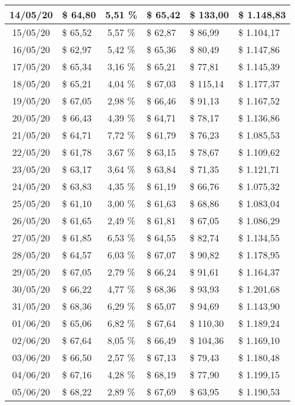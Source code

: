 \begin{center}
\begin{small}
\begin{longtable}{|c|l|c|l|l|l|}
14/05/20 & \$ 64,80 & 5,51 \% & \$ 65,42 & \$ 133,00 & \$ 1.148,83 \\ \hline
15/05/20 & \$ 65,52 & 5,57 \% & \$ 62,87 & \$ 86,99 & \$ 1.104,17 \\ \hline
16/05/20 & \$ 62,97 & 5,42 \% & \$ 65,36 & \$ 80,49 & \$ 1.147,86 \\ \hline
17/05/20 & \$ 65,34 & 3,16 \% & \$ 65,21 & \$ 77,81 & \$ 1.145,39 \\ \hline
18/05/20 & \$ 65,21 & 4,04 \% & \$ 67,03 & \$ 115,14 & \$ 1.177,37 \\ \hline
19/05/20 & \$ 67,05 & 2,98 \% & \$ 66,46 & \$ 91,13 & \$ 1.167,52 \\ \hline
20/05/20 & \$ 66,43 & 4,39 \% & \$ 64,71 & \$ 78,17 & \$ 1.136,86 \\ \hline
21/05/20 & \$ 64,71 & 7,72 \% & \$ 61,79 & \$ 76,23 & \$ 1.085,53 \\ \hline
22/05/20 & \$ 61,78 & 3,67 \% & \$ 63,15 & \$ 78,67 & \$ 1.109,62 \\ \hline
23/05/20 & \$ 63,17 & 3,64 \% & \$ 63,84 & \$ 71,35 & \$ 1.121,71 \\ \hline
24/05/20 & \$ 63,83 & 4,35 \% & \$ 61,19 & \$ 66,76 & \$ 1.075,32 \\ \hline
25/05/20 & \$ 61,10 & 3,00 \% & \$ 61,63 & \$ 68,86 & \$ 1.083,04 \\ \hline
26/05/20 & \$ 61,65 & 2,49 \% & \$ 61,81 & \$ 67,05 & \$ 1.086,29 \\ \hline
27/05/20 & \$ 61,85 & 6,53 \% & \$ 64,55 & \$ 82,74 & \$ 1.134,55 \\ \hline
28/05/20 & \$ 64,57 & 6,03 \% & \$ 67,07 & \$ 90,82 & \$ 1.178,95 \\ \hline
29/05/20 & \$ 67,05 & 2,79 \% & \$ 66,24 & \$ 91,61 & \$ 1.164,37 \\ \hline
30/05/20 & \$ 66,22 & 4,77 \% & \$ 68,36 & \$ 93,93 & \$ 1.201,68 \\ \hline
31/05/20 & \$ 68,36 & 6,29 \% & \$ 65,07 & \$ 94,69 & \$ 1.143,90 \\ \hline
01/06/20 & \$ 65,06 & 6,82 \% & \$ 67,64 & \$ 110,30 & \$ 1.189,24 \\ \hline
02/06/20 & \$ 67,64 & 8,05 \% & \$ 66,49 & \$ 104,36 & \$ 1.169,10 \\ \hline
03/06/20 & \$ 66,50 & 2,57 \% & \$ 67,13 & \$ 79,43 & \$ 1.180,48 \\ \hline
04/06/20 & \$ 67,16 & 4,28 \% & \$ 68,19 & \$ 77,90 & \$ 1.199,15 \\ \hline
05/06/20 & \$ 68,22 & 2,89 \% & \$ 67,69 & \$ 63,95 & \$ 1.190,53 \\ \hline

\end{longtable}
\end{small}
\end{center}
